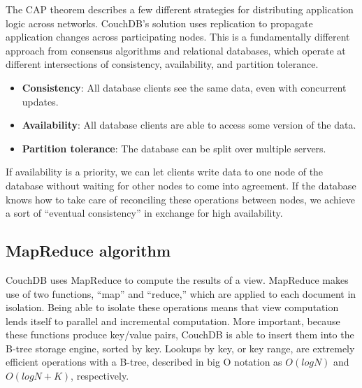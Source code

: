 The CAP theorem describes a few different strategies for distributing application 
logic across networks. CouchDB’s solution uses replication to propagate application 
changes across participating nodes. This is a fundamentally different approach from 
consensus algorithms and relational databases, which operate at different intersections 
of consistency, availability, and partition tolerance.

\begin{itemize}
    \item \textbf{Consistency}: All database clients see the same data, even with concurrent updates.
    \item \textbf{Availability}: All database clients are able to access some version of the data.
    \item \textbf{Partition tolerance}: The database can be split over multiple servers.
\end{itemize}

If availability is a priority, we can let clients write data to one node of the 
database without waiting for other nodes to come into agreement. If the database 
knows how to take care of reconciling these operations between nodes, we achieve 
a sort of “eventual consistency” in exchange for high availability.

\subsection{MapReduce algorithm}

CouchDB uses MapReduce to compute the results of a view. MapReduce makes use of two 
functions, “map” and “reduce,” which are applied to each document in isolation. 
Being able to isolate these operations means that view computation lends itself 
to parallel and incremental computation. More important, because these functions 
produce key/value pairs, CouchDB is able to insert them into the B-tree storage engine, 
sorted by key. Lookups by key, or key range, are extremely efficient operations with a 
B-tree, described in big O notation as $O(log N)$ and $O(log N + K)$, respectively.~\cite{CouchDB}

